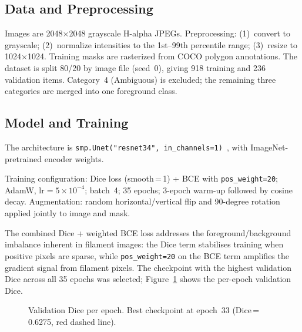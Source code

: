 \documentclass[sigconf]{acmart}
\begin{document}
\subsection{Data and Preprocessing}

Images are 2048$\times$2048 grayscale H-alpha JPEGs. Preprocessing:
(1)~convert to grayscale; (2)~normalize intensities to the 1st--99th
percentile range; (3)~resize to 1024$\times$1024. Training masks are
rasterized from COCO polygon annotations. The dataset is split 80/20
by image file (seed~0), giving 918 training and 236 validation items.
Category~4 (Ambiguous) is excluded; the remaining three categories
are merged into one foreground class.

\subsection{Model and Training}

The architecture is \texttt{smp.Unet("resnet34",
in\_channels=1)}~\cite{ronneberger2015unet,he2016resnet}, with
ImageNet-pretrained encoder weights.

Training configuration: Dice loss (smooth\,=\,1) + BCE with
\texttt{pos\_weight=20}; AdamW, $\mathrm{lr}=5\times10^{-4}$;
batch~4; 35 epochs; 3-epoch warm-up followed by cosine decay.
Augmentation: random horizontal/vertical flip and 90-degree
rotation applied jointly to image and mask.

The combined Dice + weighted BCE loss addresses the
foreground/background imbalance inherent in filament images: the
Dice term stabilises training when positive pixels are sparse,
while \texttt{pos\_weight=20} on the BCE term amplifies the
gradient signal from filament pixels. The checkpoint with the
highest validation Dice across all 35 epochs was selected;
Figure~\ref{fig:training} shows the per-epoch validation Dice.

\begin{figure}[h]
\centering
{}
\caption{Validation Dice per epoch. Best checkpoint at epoch~33
(Dice\,=\,0.6275, red dashed line).}
\label{fig:training}
\end{figure}
\end{document}
